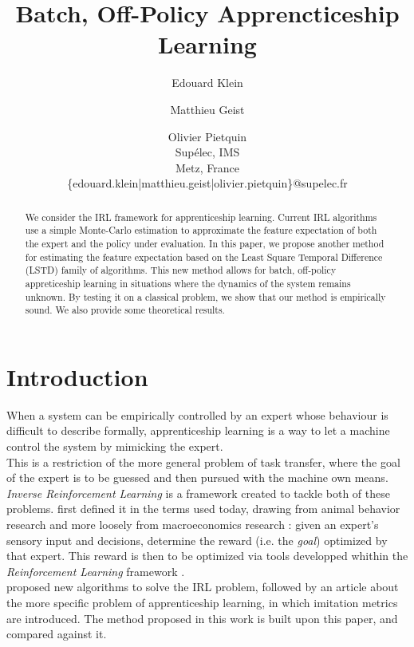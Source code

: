\documentclass{article}
\title{Batch, Off-Policy Apprencticeship Learning}
\author{Edouard Klein \and Matthieu Geist \and Olivier Pietquin \\
Supélec, IMS\\
Metz, France \\
\{edouard.klein|matthieu.geist|olivier.pietquin\}@supelec.fr}
\begin{document}
\maketitle
\tableofcontents
\begin{abstract}
We consider the IRL framework for apprenticeship learning. %
Current IRL algorithms use a simple Monte-Carlo estimation to approximate the feature expectation of both the expert and the policy under evaluation. %
In this paper, we propose another method for estimating the feature expectation based on the Least Square Temporal Difference (LSTD) family of algorithms. %
This new method allows for batch, off-policy appreticeship learning in situations where the dynamics of the system remains unknown. %
By testing it on a classical problem, we show that our method is empirically sound.%
We also provide some theoretical results.%
\end{abstract} 
\section{Introduction}
When a system can be empirically controlled by an expert whose behaviour is difficult to describe formally, apprenticeship learning is a way to let a machine control the system by mimicking the expert.\\

This is a restriction of the more general problem of task transfer, where the goal of the expert is to be guessed and then pursued with the machine own means.\\

\emph{Inverse Reinforcement Learning} is a framework created to tackle both of these problems. \citet{russell1998learning} first defined it in the terms used today, drawing from animal behavior research and more loosely from macroeconomics research : given an expert's sensory input and decisions, determine the reward (i.e. the \emph{goal}) optimized by that expert. This reward is then to be optimized via tools developped whithin the \emph{Reinforcement Learning} framework \citep{sutton1998reinforcement}.\\

\citet{ng2000algorithms} proposed new algorithms to solve the IRL problem, followed by an article \citep{abbeel2004apprenticeship} about the more specific problem of apprenticeship learning, in which imitation metrics are introduced. The method proposed in this work is built upon this paper, and compared against it.\\
\end{document}
